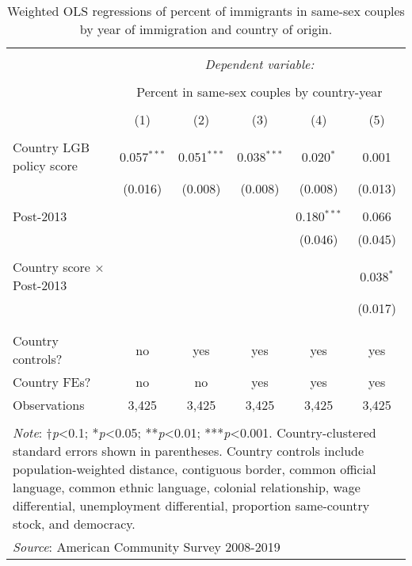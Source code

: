 \documentclass[
  11pt,
]{article}
\begin{document}
\begin{table}[H] \centering 
  \caption{Weighted OLS regressions of percent of immigrants in same-sex couples by year of immigration and country of origin.} 
  \label{tab:country-props} 
\begin{tabular}{@{\extracolsep{5pt}}lccccc} 
\\[-1.8ex]\hline 
\hline \\[-1.8ex] 
 & \multicolumn{5}{c}{\textit{Dependent variable:}} \\ 
\cline{2-6} 
\\[-1.8ex] & \multicolumn{5}{c}{Percent in same-sex couples by country-year} \\ 
\\[-1.8ex] & (1) & (2) & (3) & (4) & (5)\\ 
\hline \\[-1.8ex] 
 Country LGB policy score & 0.057$^{***}$ & 0.051$^{***}$ & 0.038$^{***}$ & 0.020$^{*}$ & 0.001 \\ 
  & (0.016) & (0.008) & (0.008) & (0.008) & (0.013) \\ 
  & & & & & \\ 
 Post-2013 &  &  &  & 0.180$^{***}$ & 0.066 \\ 
  &  &  &  & (0.046) & (0.045) \\ 
  & & & & & \\ 
 Country score × Post-2013 &  &  &  &  & 0.038$^{*}$ \\ 
  &  &  &  &  & (0.017) \\ 
  & & & & & \\ 
\hline \\[-1.8ex] 
Country controls? & no & yes & yes & yes & yes \\ 
Country FEs? & no & no & yes & yes & yes \\ 
Observations & 3,425 & 3,425 & 3,425 & 3,425 & 3,425 \\ 
\hline 
\hline \\[-1.8ex] 
\multicolumn{6}{l}{\parbox[t]{.8\textwidth}{\textit{Note}: †\textit{p}<0.1; *\textit{p}<0.05; **\textit{p}<0.01; ***\textit{p}<0.001. Country-clustered standard errors shown in parentheses. Country controls include population-weighted distance, contiguous border, common official language, common ethnic language, colonial relationship, wage differential, unemployment differential, proportion same-country stock, and democracy.}} \\ 
\multicolumn{6}{l}{\textit{Source}: American Community Survey 2008-2019} \\ 
\end{tabular} 
\end{table}
\end{document}
